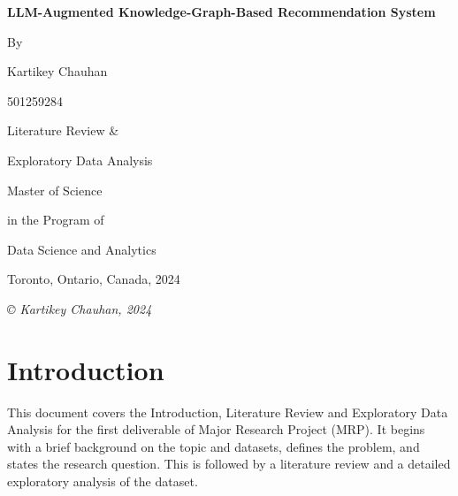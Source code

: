 \documentclass[11pt,a4paper,openany,oneside,titlepage]{article}
\begin{document}
\begin{titlepage}
\centering
{\LARGE\bfseries LLM-Augmented Knowledge-Graph-Based Recommendation System}

\vspace{1.5cm}

{\Large By}

{\Large Kartikey Chauhan

501259284 }

\vspace{2cm}
{\Large Literature Review \& 

Exploratory Data Analysis 
}

\vspace{2cm}

{\Large Master of Science

\vspace{-0.1cm}
in the Program of 

\vspace{-0.1cm}
Data Science and Analytics

}

\vspace{2cm}
{\Large Toronto, Ontario, Canada, 2024}

\vfill

{\itshape © Kartikey Chauhan, 2024}
\end{titlepage}

\setcounter{page}{2}

\tableofcontents
\listoffigures
\listoftables
\newpage

\fancyhf{}
\renewcommand{\headrulewidth}{0pt}
\fancyfoot[R]{\thepage}
\renewcommand{\footrulewidth}{0pt}

\section{Introduction}

This document covers the Introduction, Literature Review and Exploratory Data Analysis for the first deliverable of Major Research Project (MRP). It begins with a brief background on the topic and datasets, defines the problem, and states the research question. This is followed by a literature review and a detailed exploratory analysis of the dataset.
\end{document}
